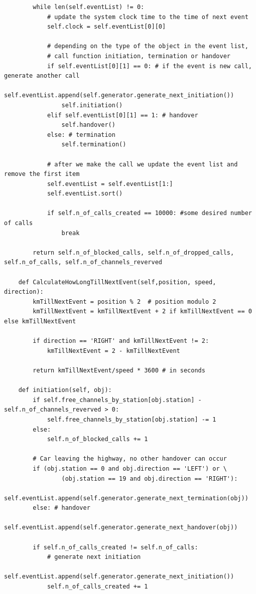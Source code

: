 \documentclass[12pt,a4paper]{article}
\begin{document}
\begin{lstlisting}
        while len(self.eventList) != 0:
            # update the system clock time to the time of next event
            self.clock = self.eventList[0][0]

            # depending on the type of the object in the event list, 
            # call function initiation, termination or handover
            if self.eventList[0][1] == 0: # if the event is new call, generate another call
                self.eventList.append(self.generator.generate_next_initiation())
                self.initiation()
            elif self.eventList[0][1] == 1: # handover
                self.handover()
            else: # termination
                self.termination()

            # after we make the call we update the event list and remove the first item
            self.eventList = self.eventList[1:]
            self.eventList.sort()
            
            if self.n_of_calls_created == 10000: #some desired number of calls
                break

        return self.n_of_blocked_calls, self.n_of_dropped_calls, self.n_of_calls, self.n_of_channels_reverved

    def CalculateHowLongTillNextEvent(self,position, speed, direction):
        kmTillNextEvent = position % 2  # position modulo 2
        kmTillNextEvent = kmTillNextEvent + 2 if kmTillNextEvent == 0 else kmTillNextEvent

        if direction == 'RIGHT' and kmTillNextEvent != 2:
            kmTillNextEvent = 2 - kmTillNextEvent

        return kmTillNextEvent/speed * 3600 # in seconds

    def initiation(self, obj):
        if self.free_channels_by_station[obj.station] - self.n_of_channels_reverved > 0:
            self.free_channels_by_station[obj.station] -= 1
        else:
            self.n_of_blocked_calls += 1

        # Car leaving the highway, no other handover can occur
        if (obj.station == 0 and obj.direction == 'LEFT') or \
                (obj.station == 19 and obj.direction == 'RIGHT'):
            self.eventList.append(self.generator.generate_next_termination(obj))
        else: # handover
            self.eventList.append(self.generator.generate_next_handover(obj))

        if self.n_of_calls_created != self.n_of_calls:
            # generate next initiation
            self.eventList.append(self.generator.generate_next_initiation())
            self.n_of_calls_created += 1


\end{lstlisting}
\end{document}
